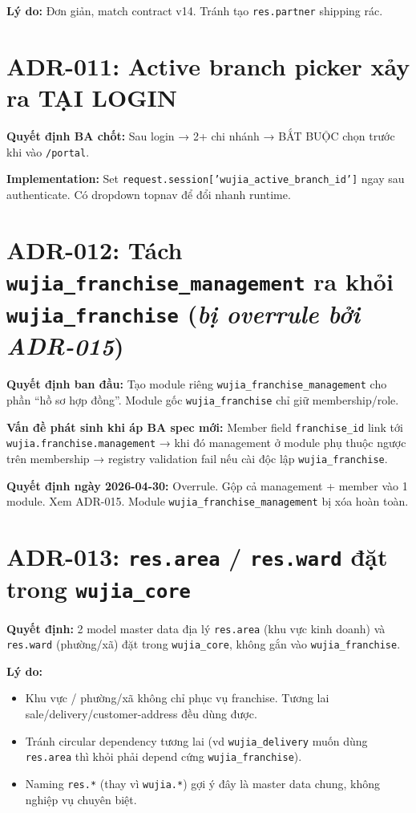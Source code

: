 \textbf{Lý do:} Đơn giản, match contract v14. Tránh tạo \texttt{res.partner} shipping rác.

\section{ADR-011: Active branch picker xảy ra TẠI LOGIN}

\textbf{Quyết định BA chốt:} Sau login → 2+ chi nhánh → BẮT BUỘC chọn trước khi vào \texttt{/portal}.

\textbf{Implementation:} Set \texttt{request.session['wujia\_active\_branch\_id']} ngay sau authenticate. Có dropdown topnav để đổi nhanh runtime.

\section{ADR-012: Tách \texttt{wujia\_franchise\_management} ra khỏi \texttt{wujia\_franchise} (\emph{bị overrule bởi ADR-015})}

\textbf{Quyết định ban đầu:} Tạo module riêng \texttt{wujia\_franchise\_management} cho phần ``hồ sơ hợp đồng''. Module gốc \texttt{wujia\_franchise} chỉ giữ membership/role.

\textbf{Vấn đề phát sinh khi áp BA spec mới:} Member field \texttt{franchise\_id} link tới \texttt{wujia.franchise.management} → khi đó management ở module phụ thuộc ngược trên membership → registry validation fail nếu cài độc lập \texttt{wujia\_franchise}.

\textbf{Quyết định ngày 2026-04-30:} Overrule. Gộp cả management + member vào 1 module. Xem ADR-015. Module \texttt{wujia\_franchise\_management} bị xóa hoàn toàn.

\section{ADR-013: \texttt{res.area} / \texttt{res.ward} đặt trong \texttt{wujia\_core}}

\textbf{Quyết định:} 2 model master data địa lý \texttt{res.area} (khu vực kinh doanh) và \texttt{res.ward} (phường/xã) đặt trong \texttt{wujia\_core}, không gắn vào \texttt{wujia\_franchise}.

\textbf{Lý do:}
\begin{itemize}
    \item Khu vực / phường/xã không chỉ phục vụ franchise. Tương lai sale/delivery/customer-address đều dùng được.
    \item Tránh circular dependency tương lai (vd \texttt{wujia\_delivery} muốn dùng \texttt{res.area} thì khỏi phải depend cứng \texttt{wujia\_franchise}).
    \item Naming \texttt{res.*} (thay vì \texttt{wujia.*}) gợi ý đây là master data chung, không nghiệp vụ chuyên biệt.
\end{itemize}

